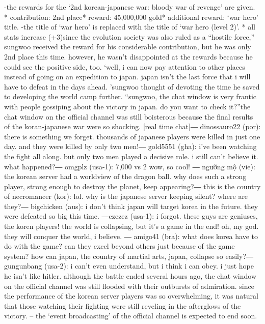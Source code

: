-the rewards for the ‘2nd korean-japanese war: bloody war of revenge’ are given.
* contribution: 2nd place* reward: 45,000,000 gold* additional reward: ‘war hero’ title.
-the title of ‘war hero’ is replaced with the title of ‘war hero (level 2)’.
* all stats increase (+3)since the evolution society was also ruled as a “hostile force,” sungwoo received the reward for his considerable contribution, but he was only 2nd place this time.
however, he wasn’t disappointed at the rewards because he could see the positive side, too.
‘well, i can now pay attention to other places instead of going on an expedition to japan.
 japan isn’t the last force that i will have to defeat in the days ahead.
’sungwoo thought of devoting the time he saved to developing the world camp further.
“sungwoo, the chat window is very frantic with people gossiping about the victory in japan.
 do you want to check it?”the chat window on the official channel was still boisterous because the final results of the koran-japanese war were so shocking.
[real time chat]― dinossauro22 (por): there is something we forget.
 thousands of japanese players were killed in just one day.
 and they were killed by only two men!― gold5551 (gha): i’ve been watching the fight all along.
 but only two men played a decisive role.
 i still can’t believe it.
 what happened?― omgplz (usa-1): 7,000 vs 2 wow, so cool!
― ngưỡng mộ (vie): the korean server had a worldview of the dragon ball.
 why does such a strong player, strong enough to destroy the planet, keep appearing?― this is the country of necromancer (kor): lol.
 why is the japanese server keeping silent? where are they?― bigchicken (aus): i don’t think japan will target korea in the future.
 they were defeated so big this time.
―ezezez (usa-1): i forgot.
 these guys are geniuses, the koren players! the world is collapsing, but it’s a game in the end! oh, my god.
 they will conquer the world, i believe.
― amigo41 (bra): what does korea have to do with the game? can they excel beyond others just because of the game system? how can japan, the country of martial arts, japan, collapse so easily?― gungunbang (usa-2): i can’t even understand, but i think i can obey.
 i just hope he isn’t like hitler.
although the battle ended several hours ago, the chat window on the official channel was still flooded with their outbursts of admiration.
 since the performance of the korean server players was so overwhelming, it was natural that those watching their fighting were still reveling in the afterglows of the victory.
– the ‘event broadcasting’ of the official channel is expected to end soon.

